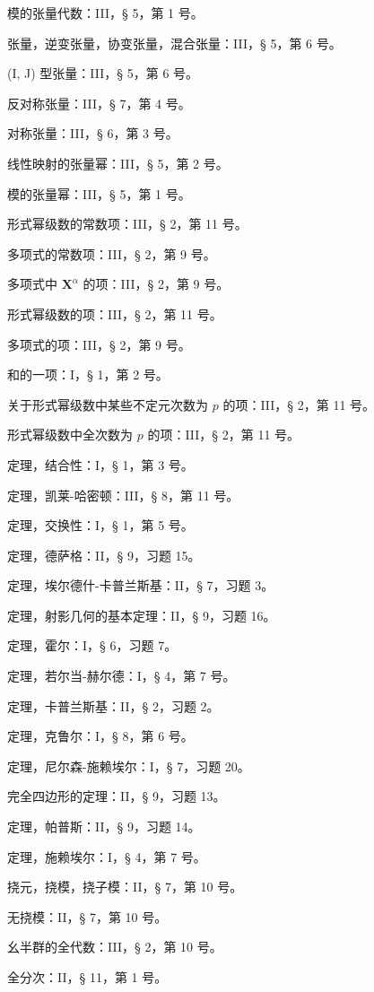 模的张量代数：III，§ 5，第 1 号。

张量，逆变张量，协变张量，混合张量：III，§ 5，第 6 号。

(I, J) 型张量：III，§ 5，第 6 号。

反对称张量：III，§ 7，第 4 号。

对称张量：III，§ 6，第 3 号。

线性映射的张量幂：III，§ 5，第 2 号。

模的张量幂：III，§ 5，第 1 号。

形式幂级数的常数项：III，§ 2，第 11 号。

多项式的常数项：III，§ 2，第 9 号。

多项式中 \(\mathbf{X}^{\alpha}\) 的项：III，§ 2，第 9 号。

形式幂级数的项：III，§ 2，第 11 号。

多项式的项：III，§ 2，第 9 号。

和的一项：I，§ 1，第 2 号。

关于形式幂级数中某些不定元次数为 \(p\) 的项：III，§ 2，第 11 号。

形式幂级数中全次数为 \(p\) 的项：III，§ 2，第 11 号。

定理，结合性：I，§ 1，第 3 号。

定理，凯莱-哈密顿：III，§ 8，第 11 号。

定理，交换性：I，§ 1，第 5 号。

定理，德萨格：II，§ 9，习题 15。

定理，埃尔德什-卡普兰斯基：II，§ 7，习题 3。

定理，射影几何的基本定理：II，§ 9，习题 16。

定理，霍尔：I，§ 6，习题 7。

定理，若尔当-赫尔德：I，§ 4，第 7 号。

定理，卡普兰斯基：II，§ 2，习题 2。

定理，克鲁尔：I，§ 8，第 6 号。

定理，尼尔森-施赖埃尔：I，§ 7，习题 20。

完全四边形的定理：II，§ 9，习题 13。

定理，帕普斯：II，§ 9，习题 14。

定理，施赖埃尔：I，§ 4，第 7 号。

挠元，挠模，挠子模：II，§ 7，第 10 号。

无挠模：II，§ 7，第 10 号。

幺半群的全代数：III，§ 2，第 10 号。

全分次：II，§ 11，第 1 号。

